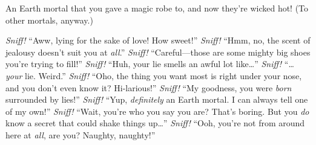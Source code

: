\documentclass[char]{iron}
\begin{document}
\begin{contacts}
  \contact{\cHotPerson{}} An Earth mortal that you gave a magic robe to, and now they're wicked hot! (To other mortals, anyway.)
\end{contacts}

\begin{contacts}[Scents]
  \contact{\cServant{}} \emph{Sniff!} ``Aww, lying for the sake of love! How sweet!''
  \contact{\cLieutenant{}} \emph{Sniff!} ``Hmm, no, the scent of jealousy doesn't suit you at \emph{all}.''
  \contact{\cGuildmaster{}} \emph{Sniff!} ``Careful---those are some mighty big shoes you're trying to fill!''
  \contact{\cFakePriest{}} \emph{Sniff!} ``Huh, your lie smells an awful lot like\ldots''
  \contact{\cRealPriest{}} \emph{Sniff!} ``\ldots\emph{your} lie. Weird.''
  \contact{\cPatriot{}} \emph{Sniff!} ``Oho, the thing you want most is right under your nose, and you don't even know it? Hi-larious!''
  \contact{\cBastard{}} \emph{Sniff!} ``My goodness, you were \emph{born} surrounded by lies!''
  \contact{\cMulan{}} \emph{Sniff!} ``Yup, \emph{definitely} an Earth mortal. I can always tell one of my own!''
  \contact{\cRoyalty{}} \emph{Sniff!} ``Wait, you're who you say you are? That's boring. But you \emph{do} know a secret that could shake things up\ldots''
  \contact{\cSpy{}} \emph{Sniff!} ``Ooh, you're not from around here at \emph{all}, are you? Naughty, naughty!''
\end{contacts}
\end{document}
